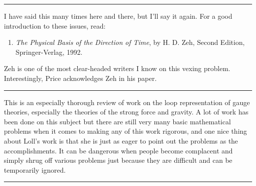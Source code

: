 \documentclass{article}
\def\tightlist{}
\renewcommand{\texttt}[1]{%
  \begingroup
  \ttfamily
  \begingroup\lccode`~=`/\lowercase{\endgroup\def~}{/\discretionary{}{}{}}%
  \begingroup\lccode`~=`[\lowercase{\endgroup\def~}{[\discretionary{}{}{}}%
  \begingroup\lccode`~=`.\lowercase{\endgroup\def~}{.\discretionary{}{}{}}%
  \catcode`/=\active\catcode`[=\active\catcode`.=\active
  \scantokens{#1\noexpand}%
  \endgroup
}
\begin{document}
\begin{center}\rule{0.5\linewidth}{0.5pt}\end{center}

I have said this many times here and there, but I'll say it again. For a
good introduction to these issues, read:

\begin{enumerate}
\def\labelenumi{\arabic{enumi})}
\setcounter{enumi}{1}
\tightlist
\item
  \emph{The Physical Basis of the Direction of Time}, by H. D. Zeh,
  Second Edition, Springer-Verlag, 1992.
\end{enumerate}

Zeh is one of the most clear-headed writers I know on this vexing
problem. Interestingly, Price acknowledges Zeh in his paper.

\begin{center}\rule{0.5\linewidth}{0.5pt}\end{center}


This is an especially thorough review of work on the loop representation
of gauge theories, especially the theories of the strong force and
gravity. A lot of work has been done on this subject but there are still
very many basic mathematical problems when it comes to making any of
this work rigorous, and one nice thing about Loll's work is that she is
just as eager to point out the problems as the accomplishments. It can
be dangerous when people become complacent and simply shrug off various
problems just because they are difficult and can be temporarily ignored.

\begin{center}\rule{0.5\linewidth}{0.5pt}\end{center}

\end{document}
